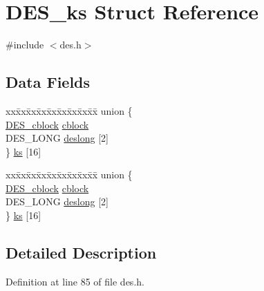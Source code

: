\hypertarget{struct_d_e_s__ks}{}\section{D\+E\+S\+\_\+ks Struct Reference}
\label{struct_d_e_s__ks}


{\ttfamily \#include $<$des.\+h$>$}

\subsection*{Data Fields}
\begin{DoxyCompactItemize}
\item 
\begin{tabbing}
xx\=xx\=xx\=xx\=xx\=xx\=xx\=xx\=xx\=\kill
union \{\\
\>\hyperlink{include_2openssl_2des_8h_adcbbb795f912b83b7aa8c2660eb1bee4}{DES\_cblock} \hyperlink{struct_d_e_s__ks_af5531b9badae68320fca1f5efbafd1cb}{cblock}\\
\>DES\_LONG \hyperlink{struct_d_e_s__ks_aec2698bc0fb4b7ada132f0e3830da9a5}{deslong} \mbox{[}2\mbox{]}\\
\} \hyperlink{struct_d_e_s__ks_a95d06efd348c01f8d5575ad4a3e0723a}{ks} \mbox{[}16\mbox{]}\\

\end{tabbing}\item 
\begin{tabbing}
xx\=xx\=xx\=xx\=xx\=xx\=xx\=xx\=xx\=\kill
union \{\\
\>\hyperlink{include_2openssl_2des_8h_adcbbb795f912b83b7aa8c2660eb1bee4}{DES\_cblock} \hyperlink{struct_d_e_s__ks_af5531b9badae68320fca1f5efbafd1cb}{cblock}\\
\>DES\_LONG \hyperlink{struct_d_e_s__ks_aec2698bc0fb4b7ada132f0e3830da9a5}{deslong} \mbox{[}2\mbox{]}\\
\} \hyperlink{struct_d_e_s__ks_a410c4c66747b8399b2c3b0887c8a6701}{ks} \mbox{[}16\mbox{]}\\

\end{tabbing}\end{DoxyCompactItemize}


\subsection{Detailed Description}


Definition at line 85 of file des.\+h.



